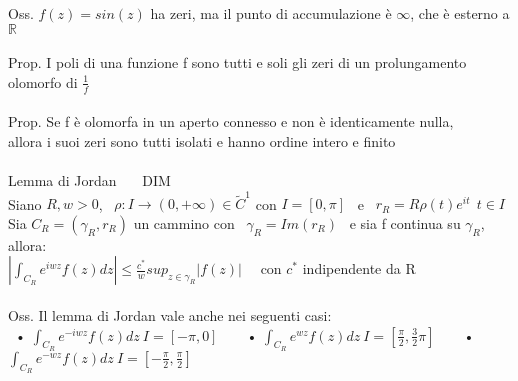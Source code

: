 \documentclass{article}
\theoremstyle{unnumbered}
\theoremstyle{unnumbered1}
\begin{document}
Oss. $f(z)=sin(z)$ ha zeri, ma il punto di accumulazione è $\infty$, che è esterno a $\mathbb{R}$\\ \\
%
Prop. I poli di una funzione f sono tutti e soli gli zeri di un prolungamento olomorfo di $\frac{1}{f}$\\ \\
%
Prop. Se f è olomorfa in un aperto connesso e non è identicamente nulla,\\ allora i suoi zeri sono tutti isolati e hanno ordine intero e finito\\ \\
%
%
Lemma di Jordan \ \ \ DIM\\
Siano $R,w>0$, \ $\rho:I\rightarrow(0,+\infty) \in \widetilde{C}^1$ con $I=[0,\pi]$ \ e \ $r_R=R\rho(t)e^{it} \ \ t\in I$ \\
Sia $C_R=(\gamma_R,r_R)$ un cammino con \ $\gamma_R=Im(r_R)$ \ e sia f continua su $\gamma_R$, allora:\\
$|\int_{C_R}e^{iwz} f(z)dz|\le \frac{c^*}{w}sup_{z\in\gamma_R}|f(z)|$ \ \ con $c^*$ indipendente da R\\ \\
%
Oss. Il lemma di Jordan vale anche nei seguenti casi:\\
\ • $\int_{C_R}e^{-iwz}f(z)dz \ I=[-\pi,0]$\ \ \
\ • $\int_{C_R}e^{wz}f(z)dz \ I=[\frac{\pi}{2},\frac{3}{2}\pi]$\ \ \
\ • $\int_{C_R}e^{-wz}f(z)dz \ I=[-\frac{\pi}{2},\frac{\pi}{2}]$\\
%
%
\end{document}
